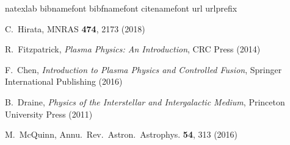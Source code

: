 \documentclass{article}
\begin{document}
\label{section_model_comparision}


\begin{thebibliography}{95}
\expandafter\ifx\csname natexlab\endcsname\relax\def\natexlab#1{#1}\fi
\expandafter\ifx\csname bibnamefont\endcsname\relax
  \def\bibnamefont#1{#1}\fi
\expandafter\ifx\csname bibfnamefont\endcsname\relax
  \def\bibfnamefont#1{#1}\fi
\expandafter\ifx\csname citenamefont\endcsname\relax
  \def\citenamefont#1{#1}\fi
\expandafter\ifx\csname url\endcsname\relax
  \def\url#1{\texttt{#1}}\fi
\expandafter\ifx\csname urlprefix\endcsname\relax\def\urlprefix{URL }\fi
\providecommand{\bibinfo}[2]{#2}
\providecommand{\eprint}[2][]{\url{#2}}
  
  
	C.~Hirata,
	MNRAS {\bf 474}, 2173 (2018)

	R.~Fitzpatrick,
	\textit{Plasma Physics: An Introduction},
	CRC Press (2014)

	F.~Chen,
	\textit{Introduction to Plasma Physics and Controlled Fusion},
	Springer International Publishing (2016)

	B.~Draine,
	\textit{Physics of the Interstellar and Intergalactic Medium},
	Princeton University Press (2011)

	M.~McQuinn,
	Annu.\ Rev.\ Astron.\ Astrophys. {\bf 54}, 313 (2016)
 

\end{thebibliography}
\end{document}

